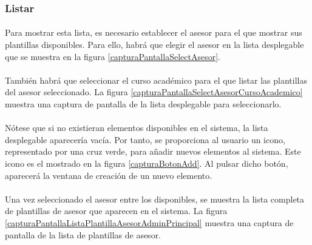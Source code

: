 \subsubsection{Listar}

  \paragraph{}Para mostrar esta lista, es necesario establecer el asesor para
  el que mostrar sus plantillas disponibles. Para ello, habrá que elegir
  el asesor en la lista desplegable que se muestra en la figura
  \ref{capturaPantallaSelectAsesor}.

  \paragraph{}También habrá que seleccionar el curso académico para el que
  listar las plantillas del asesor seleccionado. La figura
  \ref{capturaPantallaSelectAsesorCursoAcademico} muestra una captura de
  pantalla de la lista desplegable para seleccionarlo.

  \paragraph{}Nótese que si no existieran elementos disponibles en el sistema,
  la lista desplegable aparecería vacía. Por tanto, se proporciona al usuario
  un icono, representado por una cruz verde, para añadir nuevos elementos al
  sistema. Este icono es el mostrado en la figura \ref{capturaBotonAdd}. Al
  pulsar dicho botón, aparecerá la ventana de creación de un nuevo elemento.

  \paragraph{}Una vez seleccionado el asesor entre los disponibles, se muestra
  la lista completa de plantillas de asesor que aparecen en el sistema. La
  figura \ref{capturaPantallaListaPlantillaAsesorAdminPrincipal} muestra una
  captura de pantalla de la lista de plantillas de asesor.

